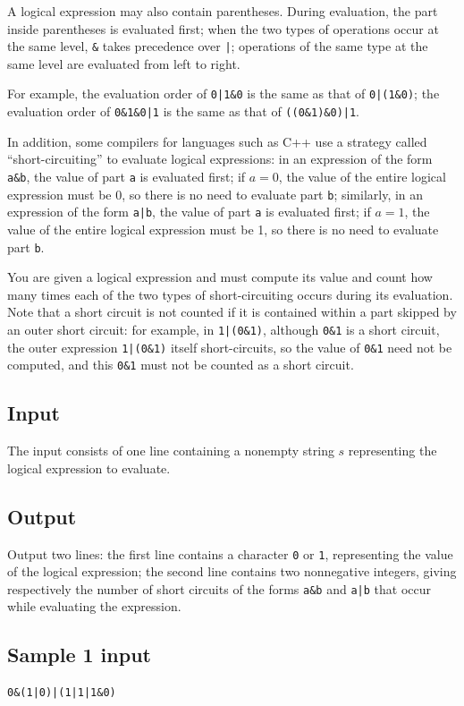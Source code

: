 \documentclass[11pt]{article}
\begin{document}
A logical expression may also contain parentheses.
During evaluation, the part inside parentheses is evaluated first;
when the two types of operations occur at the same level,
\verb|&| takes precedence over \verb!|!;
operations of the same type at the same level are evaluated from
left to right.

For example, the evaluation order of \verb!0|1&0! is the same as that of
\verb!0|(1&0)!; the evaluation order of \verb!0&1&0|1! is the same as that of
\verb!((0&1)&0)|1!.

In addition, some compilers for languages such as C++ use a strategy
called ``short-circuiting'' to evaluate logical expressions: in an
expression of the form \verb|a&b|, the value of part \texttt{a} is evaluated
first; if $a=0$, the value of the entire logical expression must be 0,
so there is no need to evaluate part \texttt{b}; similarly, in an expression
of the form \verb!a|b!, the value of part \texttt{a} is evaluated first;
if $a=1$, the value of the entire logical expression must be 1,
so there is no need to evaluate part \texttt{b}.

You are given a logical expression and must compute its value and count
how many times each of the two types of short-circuiting occurs during
its evaluation.
Note that a short circuit is not counted if it is contained within a part
skipped by an outer short circuit: for example, in \verb!1|(0&1)!,
although \verb|0&1| is a short circuit, the outer expression
\verb!1|(0&1)! itself short-circuits, so the value of \verb|0&1| need not
be computed, and this \verb|0&1| must not be counted as a short circuit.

\subsection*{Input}
The input consists of one line containing a nonempty string $s$
representing the logical expression to evaluate.

\subsection*{Output}
Output two lines: the first line contains a character \texttt{0} or
\texttt{1}, representing the value of the logical expression;
the second line contains two nonnegative integers, giving respectively
the number of short circuits of the forms \verb|a&b| and \verb!a|b!
that occur while evaluating the expression.

\subsection*{Sample 1 input}
\begin{verbatim}
0&(1|0)|(1|1|1&0)
\end{verbatim}
\end{document}
